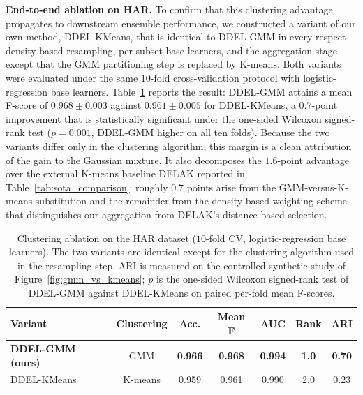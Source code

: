 \documentclass[lettersize,journal]{IEEEtran}
\newcommand{\tfourhighlight}[1]{\textcolor{tier4blue}{#1}}
\begin{document}
	\tfourhighlight{\noindent \textbf{End-to-end ablation on HAR.} To confirm that this clustering advantage propagates to downstream ensemble performance, we constructed a variant of our own method, DDEL-KMeans, that is identical to DDEL-GMM in every respect---density-based resampling, per-subset base learners, and the aggregation stage---except that the GMM partitioning step is replaced by K-means. Both variants were evaluated under the same $10$-fold cross-validation protocol with logistic-regression base learners. Table~\ref{tab:clustering_ablation} reports the result: DDEL-GMM attains a mean F-score of $0.968 \pm 0.003$ against $0.961 \pm 0.005$ for DDEL-KMeans, a $0.7$-point improvement that is statistically significant under the one-sided Wilcoxon signed-rank test ($p = 0.001$, DDEL-GMM higher on all ten folds). Because the two variants differ only in the clustering algorithm, this margin is a clean attribution of the gain to the Gaussian mixture. It also decomposes the $1.6$-point advantage over the external K-means baseline DELAK reported in Table~\ref{tab:sota_comparison}: roughly $0.7$ points arise from the GMM-versus-K-means substitution and the remainder from the density-based weighting scheme that distinguishes our aggregation from DELAK's distance-based selection.}
	
	\begin{table}[H]
		\begin{center}
			\caption{Clustering ablation on the HAR dataset ($10$-fold CV, logistic-regression base learners). The two variants are identical except for the clustering algorithm used in the resampling step. ARI is measured on the controlled synthetic study of Figure~\ref{fig:gmm_vs_kmeans}; $p$ is the one-sided Wilcoxon signed-rank test of DDEL-GMM against DDEL-KMeans on paired per-fold mean F-scores.}
			\label{tab:clustering_ablation}
			\setlength{\tabcolsep}{3pt}
			\begin{tabular}{|l|c|c|c|c|c|c|}
				\hline
				\textbf{Variant} & \textbf{Clustering} & \textbf{Acc.} & \textbf{Mean F} & \textbf{AUC} & \textbf{Rank} & \textbf{ARI} \\
				\hline
				\textbf{DDEL-GMM (ours)} & GMM & \textbf{0.966} & \textbf{0.968} & \textbf{0.994} & \textbf{1.0} & \textbf{0.70} \\
				\hline
				DDEL-KMeans & K-means & 0.959 & 0.961 & 0.990 & 2.0 & 0.23 \\
				\hline
			\end{tabular}
		\end{center}
	\end{table}
	
\end{document}
